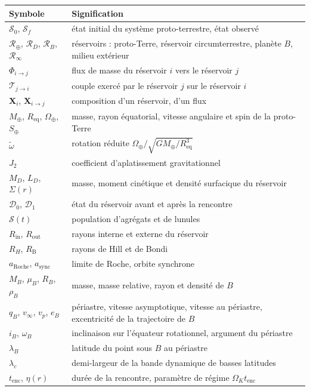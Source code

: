 \documentclass[11pt,a4paper,openany]{report}
\newcommand{\Mt}{M_{\oplus}}
\newcommand{\Req}{R_{\mathrm{eq}}}
\newcommand{\aR}{a_{\mathrm{Roche}}}
\newcommand{\RT}{\mathcal{R}_{\oplus}}
\newcommand{\RD}{\mathcal{R}_{D}}
\newcommand{\RB}{\mathcal{R}_{B}}
\newcommand{\Rinf}{\mathcal{R}_{\infty}}
\begin{document}
\small
\begin{longtable}{>{\raggedright\arraybackslash}p{3.2cm}>{\raggedright\arraybackslash}p{11.6cm}}
\toprule
\textbf{Symbole} & \textbf{Signification} \\
\midrule
\endhead
$\mathcal{S}_0$, $\mathcal{S}_f$ & état initial du système proto-terrestre, état observé \\
$\RT$, $\RD$, $\RB$, $\Rinf$ & réservoirs : proto-Terre, réservoir circumterrestre, planète $B$, milieu extérieur \\
$\Phi_{i\to j}$ & flux de masse du réservoir $i$ vers le réservoir $j$ \\
$\boldsymbol{\mathcal{T}}_{j\to i}$ & couple exercé par le réservoir $j$ sur le réservoir $i$ \\
$\mathbf{X}_i$, $\mathbf{X}_{i\to j}$ & composition d'un réservoir, d'un flux \\
$\Mt$, $\Req$, $\Omega_\oplus$, $S_\oplus$ & masse, rayon équatorial, vitesse angulaire et spin de la proto-Terre \\
$\tilde\omega$ & rotation réduite $\Omega_\oplus/\sqrt{G\Mt/\Req^3}$ \\
$J_2$ & coefficient d'aplatissement gravitationnel \\
$M_D$, $L_D$, $\Sigma(r)$ & masse, moment cinétique et densité surfacique du réservoir \\
$\mathcal{D}_0$, $\mathcal{D}_1$ & état du réservoir avant et après la rencontre \\
$\mathcal{S}(t)$ & population d'agrégats et de lunules \\
$R_{\mathrm{in}}$, $R_{\mathrm{out}}$ & rayons interne et externe du réservoir \\
$R_H$, $R_{\mathrm{B}}$ & rayons de Hill et de Bondi \\
$\aR$, $a_{\mathrm{sync}}$ & limite de Roche, orbite synchrone \\
$M_B$, $\mu_B$, $R_B$, $\rho_B$ & masse, masse relative, rayon et densité de $B$ \\
$q_B$, $v_\infty$, $v_p$, $e_B$ & périastre, vitesse asymptotique, vitesse au périastre, excentricité de la trajectoire de $B$ \\
$i_B$, $\omega_B$ & inclinaison sur l'équateur rotationnel, argument du périastre \\
$\lambda_B$ & latitude du point sous $B$ au périastre \\
$\lambda_c$ & demi-largeur de la bande dynamique de basses latitudes \\
$t_{\mathrm{enc}}$, $\eta(r)$ & durée de la rencontre, paramètre de régime $\Omega_Kt_{\mathrm{enc}}$ \\

\end{longtable}
\end{document}
